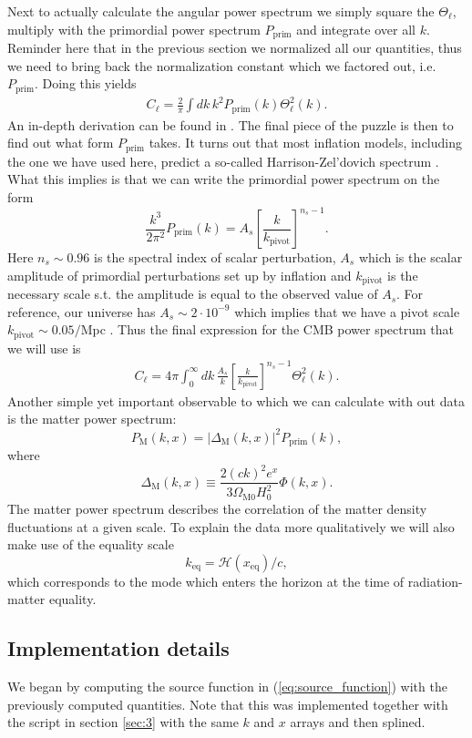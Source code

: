 \documentclass[%
reprint,
 amsmath,amssymb,
 aps,
]{revtex4-2}
\newcommand{\Hp}{\mathcal{H}}
\begin{document}
Next to actually calculate the angular power spectrum we simply square the $\Theta_\ell$, multiply with the primordial power spectrum $P_\text{prim}$ and integrate over all $k$. Reminder here that in the previous section we normalized all our quantities, thus we need to bring back the normalization constant which we factored out, i.e. $P_\text{prim}$. Doing this yields
\begin{align}
	C_\ell=\frac{2}{\pi}\int dk\,k^2P_\text{prim}(k)\Theta_\ell^2(k).
	\label{eq:Cell}
\end{align}
An in-depth derivation can be found in \cite{AST5220LectureNotes}. The final piece of the puzzle is then to find out what form $P_\text{prim}$ takes. It turns out that most inflation models, including the one we have used here, predict a so-called Harrison-Zel'dovich spectrum \cite{AST5220LectureNotes}. What this implies is that we can write the primordial power spectrum on the form
\[\frac{k^3}{2\pi^2}P_\text{prim}(k)=A_s\left[\frac{k}{k_\text{pivot}}\right]^{n_s-1}.\]
Here $n_s\sim0.96$ is the spectral index of scalar perturbation, $A_s$ which is the scalar amplitude of primordial perturbations set up by inflation and $k_\text{pivot}$ is the necessary scale s.t. the amplitude is equal to the observed value of $A_s$. For reference, our universe has $A_s\sim2\cdot10^{-9}$ which implies that we have a pivot scale $k_\text{pivot}\sim0.05/$Mpc \cite{AST5220LectureNotes}. Thus the final expression for the CMB power spectrum that we will use is
\begin{align}
	C_\ell=4\pi\int_0^\infty dk\,\frac{A_s}{k}\left[\frac{k}{k_\text{pivot}}\right]^{n_s-1}\Theta_\ell^2(k).
	\label{eq:Cell_final}
\end{align}
Another simple yet important observable to which we can calculate with out data is the matter power spectrum:
\begin{equation}
	P_\text{M}(k,x)=|\Delta_\text{M}(k,x)|^2P_\text{prim}(k),
	\label{eq:mat_pow}
\end{equation}
where
\[\Delta_\text{M}(k,x)\equiv\frac{2(ck)^2e^x}{3\Omega_\text{M0}H_0^2}\Phi(k,x).\]
The matter power spectrum describes the correlation of the matter density fluctuations at a given scale. To explain the data more qualitatively we will also make use of the equality scale
\[k_\text{eq}=\Hp(x_\text{eq})/c,\]
which corresponds to the mode which enters the horizon at the time of radiation-matter equality.

\subsection{Implementation details}
We began by computing the source function in (\ref{eq:source_function}) with the previously computed quantities. Note that this was implemented together with the script in section \ref{sec:3} with the same $k$ and $x$ arrays and then splined.
\end{document}
